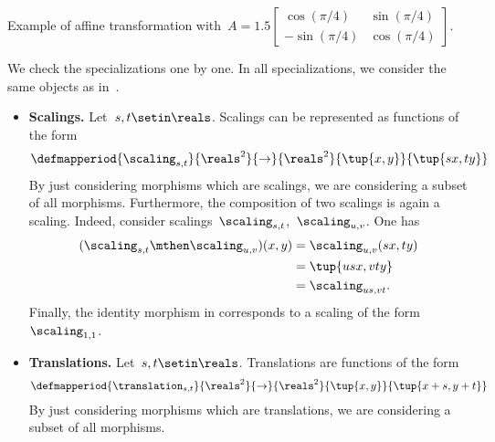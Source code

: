 \begin{solution}
    \begin{marginfigure}
        \begin{center}
        \end{center}
        \caption{Example of affine transformation with~$A=1.5\begin{bmatrix}\cos(\pi/4)&\sin(\pi/4)\\-\sin(\pi/4)&\cos(\pi/4)\end{bmatrix}$.}
    \end{marginfigure}
    We check the specializations one by one.
    In all specializations, we consider the same objects as in~\Draw.
    \begin{itemize}
        \item \textbf{Scalings.}
              Let~$s,t\setin \reals$.
              Scalings can be represented as functions of the form
              \begin{equation*}
                  \defmapperiod{\scaling_{s,t}}{\reals^2}{\to}{\reals^2}{\tup{x,y}}{\tup{s x,t y}}
              \end{equation*}
              By just considering morphisms which are scalings, we are considering a subset of all morphisms.
              Furthermore, the composition of two scalings is again a scaling.
              Indeed, consider scalings~$\scaling_{s,t}$,~$\scaling_{u,v}$.
              One has
              \begin{equation*}
                  \begin{aligned}
                      (\scaling_{s,t}\mthen \scaling_{u,v})(x,y) & =\scaling_{u,v}(sx, ty) \\
                                                                 & =\tup{usx, vty} \\
                                                                 & =\scaling_{us,vt}.
                  \end{aligned}
              \end{equation*}
              Finally, the identity morphism in \Draw corresponds to a scaling of the form~$\scaling_{1,1}$.
        \item \textbf{Translations.}
              Let~$s,t\setin \reals$.
              Translations are functions of the form
              \begin{equation*}
                  \defmapperiod{\translation_{s,t}}{\reals^2}{\to}{\reals^2}{\tup{x,y}}{\tup{x+s,y+t}}
              \end{equation*}
              By just considering morphisms which are translations, we are considering a subset of all morphisms.

\end{itemize}
\end{solution}
